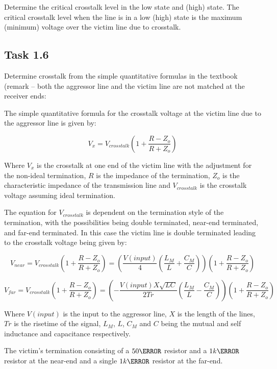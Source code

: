 \documentclass[../main.tex]{subfiles}
\begin{document}
\vspace{10pt}
Determine the critical crosstalk level in the low state and (high) state. The critical crosstalk level when the line is in a low (high) state is the maximum (minimum) voltage over the victim line due to crosstalk.

\solution

\subsection{Task 1.6}


Determine crosstalk from the simple quantitative formulas in the textbook (remark – both the aggressor line and the victim line are not matched at the receiver ends:

\solution

The simple quantitative formula for the crosstalk voltage at the victim line due to the aggressor line is given by:

\begin{equation*}
    V_x = V_{crosstalk} (1+ \frac{R-Z_o}{R+Z_o}) 
\end{equation*}

Where $V_x$ is the crosstalk at one end of the victim line with the adjustment for the non-ideal termination, $R$ is the impedance of the termination, $Z_o$ is the characteristic impedance of the transmission line and $V_{crosstalk}$ is the crosstalk voltage assuming ideal termination.

\vspace{10pt}

The equation for $V_{crosstalk}$ is dependent on the termination style of the termination, with the possibilities being double terminated, near-end terminated, and far-end terminated. In this case the victim line is double terminated leading to the crosstalk voltage being given by:

\begin{equation*}
    V_{near} = V_{crosstalk} \left(1+ \frac{R-Z_o}{R+Z_o} \right) = \left(\frac{V(input)}{4} \left(\frac{L_M}{L} + \frac{C_M}{C} \right) \right) \left(1+ \frac{R-Z_o}{R+Z_o} \right)
\end{equation*}

\begin{equation*}
    V_{far} = V_{crosstalk} \left(1+ \frac{R-Z_o}{R+Z_o} \right) = \left(-\frac{V(input)X\sqrt{LC}}{2Tr} \left(\frac{L_M}{L} - \frac{C_M}{C} \right) \right) \left(1+ \frac{R-Z_o}{R+Z_o} \right)
\end{equation*}

Where $V(input)$ is the input to the aggressor line, $X$ is the length of the lines, $Tr$ is the risetime of the signal, $L_M$, $L$, $C_M$ and $C$ being the mutual and self inductance and capacitance respectively.

\vspace{10pt}

The victim's termination consisting of a $50\ohm$ resistor and a $1k\ohm$ resistor at the near-end and a single $1k\ohm$ resistor at the far-end.
\end{document}
